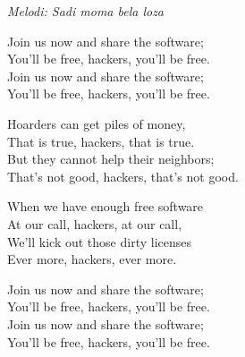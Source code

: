 {\footnotesize\textit{Melodi: Sadi moma bela loza}}\par
\vspace{10pt}
Join us now and share the software;\\
You'll be free, hackers, you'll be free.\\
Join us now and share the software;\\
You'll be free, hackers, you'll be free.\par
\vspace{10pt}
Hoarders can get piles of money,\\
That is true, hackers, that is true.\\
But they cannot help their neighbors;\\
That's not good, hackers, that's not good.\par
\vspace{10pt}
When we have enough free software\\
At our call, hackers, at our call,\\
We'll kick out those dirty licenses\\
Ever more, hackers, ever more.\par
\vspace{10pt}
Join us now and share the software;\\
You'll be free, hackers, you'll be free.\\
Join us now and share the software;\\
You'll be free, hackers, you'll be free.
